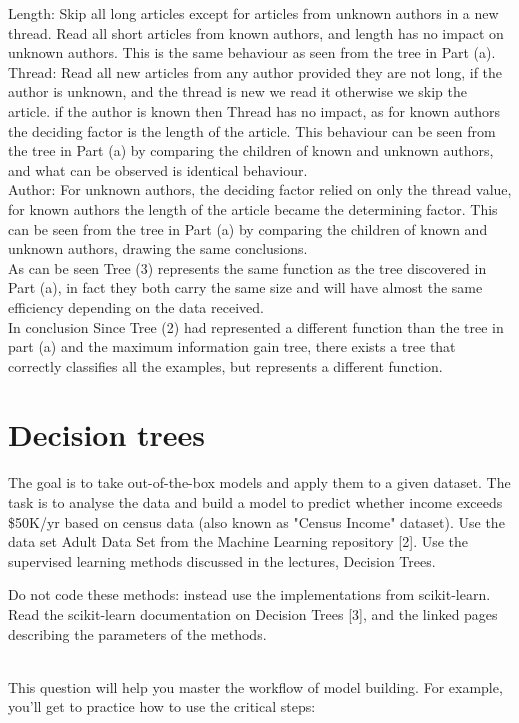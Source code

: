 \documentclass{article}
\begin{document}
\begin{enumerate}[(a)]
Length: Skip all long articles except for articles from unknown authors in a new thread. Read all short articles from known authors, and length has no impact on unknown authors. This is the same behaviour as seen from the tree in Part (a).\\

Thread: Read all new articles from any author provided they are not long, if the author is unknown, and the thread is new we read it otherwise we skip the article. if the author is known then Thread has no impact, as for known authors the deciding factor is the length of the article. This behaviour can be seen from the tree in Part (a) by comparing the children of known and unknown authors, and what can be observed is identical behaviour.\\

Author: For unknown authors, the deciding factor relied on only the thread value, for known authors the length of the article became the determining factor. This can be seen from the tree in Part (a) by comparing the children of known and unknown authors, drawing the same conclusions.\\

As can be seen Tree (3) represents the same function as the tree discovered in Part (a), in fact they both carry the same size and will have almost the same efficiency depending on the data received.\\

In conclusion Since Tree (2) had represented a different function than the tree in part (a) and the maximum information gain tree, there exists a tree that correctly classifies all the examples, but represents a different function.
\end{enumerate}

\newpage
\section{Decision trees}
The goal is to take out-of-the-box models and apply them to a given dataset. The task is to analyse the data and build a model to predict whether income exceeds \$50K/yr based on census data (also known as "Census Income" dataset). Use the data set Adult Data Set from the Machine Learning repository [2]. Use the supervised learning methods discussed in the lectures, Decision Trees.

\begin{flushleft}
Do not code these methods: instead use the implementations from scikit-learn. Read the scikit-learn documentation on Decision Trees [3], and the linked pages describing the parameters of the methods.\\\\
\end{flushleft}
This question will help you master the workflow of model building. For example, you’ll get to practice how to use the critical steps:
\end{document}
